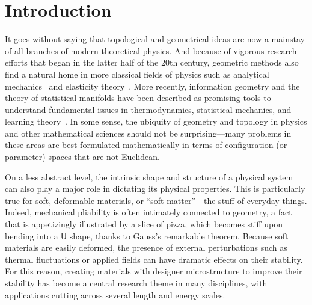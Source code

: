 
\chapter{Introduction}


It goes without saying that topological and geometrical ideas are now a mainstay of all branches of modern theoretical physics.
And because of vigorous research efforts that began in the latter half of the 20th century, geometric methods also find a natural home in more classical fields of physics such as analytical mechanics~\cite{arnold1978,souder2017} and elasticity theory~\cite{marsden1994}.
More recently, information geometry and the theory of statistical manifolds have been described as promising tools to understand fundamental issues in thermodynamics, statistical mechanics, and learning theory~\cite{ruppeiner1995}.
In some sense, the ubiquity of geometry and topology in physics and other mathematical sciences should not be surprising---many problems in these areas are best formulated mathematically in terms of configuration (or parameter) spaces that are not Euclidean.

On a less abstract level, the intrinsic shape and structure of a physical system can also play a major role in dictating its physical properties.
This is particularly true for soft, deformable materials, or ``soft matter''---the stuff of everyday things.
Indeed, mechanical pliability is often intimately connected to geometry, a fact that is appetizingly illustrated by a slice of pizza, which becomes stiff upon bending into a $\textsf{U}$ shape, thanks to Gauss's remarkable theorem.
Because soft materials are easily deformed, the presence of external perturbations such as thermal fluctuations or applied fields can have dramatic effects on their stability.
For this reason, creating materials with designer microstructure to improve their stability has become a central research theme in many disciplines, with applications cutting across several length and energy scales.

